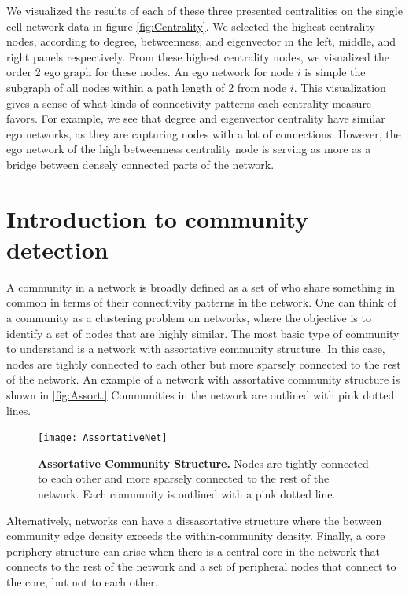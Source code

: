 \indent We visualized the results of each of these three presented centralities on the single cell network data in figure \ref{fig:Centrality}. We selected the highest centrality nodes, according to degree, betweenness, and eigenvector in the left, middle, and right panels respectively. From these highest centrality nodes, we visualized the order 2 ego graph for these nodes. An ego network for node $i$ is simple the subgraph of all nodes within a path length of 2 from node $i$. This visualization gives a sense of what kinds of connectivity patterns each centrality measure favors. For example, we see that degree and eigenvector centrality have similar ego networks, as they are capturing nodes with a lot of connections. However, the ego network of the high betweenness centrality node is serving as more as a bridge between densely connected parts of the network. 


\section{Introduction to community detection}
A community in a network is broadly defined as a set of who share something in common in terms of their connectivity patterns in the network. One can think of a community as a clustering problem on networks, where the objective is to identify a set of nodes that are highly similar. The most basic type of community to understand is a network with assortative community structure. In this case, nodes are tightly connected to each other but more sparsely connected to the rest of the network. An example of a network with assortative community structure is shown in \ref{fig:Assort.} Communities in the network are outlined with pink dotted lines.

 \begin{figure}
\begin{center}
\texttt{[image: AssortativeNet]}
\caption{{\bf Assortative Community Structure.} Nodes are tightly connected to each other and more sparsely connected to the rest of the network. Each community is outlined with a pink dotted line.}
\label{fig:Assort}
\end{center}
\end{figure}

Alternatively, networks can have a dissasortative structure where the between community edge density exceeds the within-community density. Finally, a core periphery structure can arise when there is a central core in the network that connects to the rest of the network and a set of peripheral nodes that connect to the core, but not to each other.  

